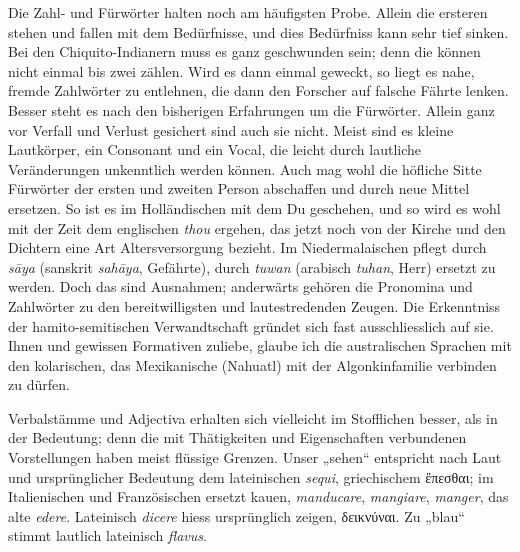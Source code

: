 Die Zahl- und Fürwörter halten noch am häufigsten Probe. Allein die ersteren stehen und fallen mit dem Bedürfnisse, und dies Bedürfniss kann sehr tief sinken. Bei den Chiquito-Indianern muss es ganz geschwunden sein; denn die können nicht einmal bis zwei zählen. Wird es dann einmal geweckt, so liegt es nahe, fremde Zahlwörter zu entlehnen, die dann den Forscher auf falsche Fährte lenken. Besser steht es nach den bisherigen Erfahrungen um die Fürwörter. Allein ganz vor Verfall und Verlust gesichert sind auch sie nicht. Meist sind es kleine Lautkörper, ein Consonant und ein Vocal, die leicht durch lautliche Veränderungen unkenntlich werden können. Auch mag wohl die höfliche Sitte Fürwörter der ersten und zweiten Person abschaffen und durch neue Mittel ersetzen. So ist es im Holländischen mit dem Du geschehen, und so wird es wohl mit der Zeit dem englischen \textit{thou} ergehen, das jetzt noch von der Kirche und den Dichtern eine Art Altersversorgung bezieht. Im Niedermalaischen pflegt  durch \textit{sāya} (sanskrit \textit{sahāya}, Gefährte),  durch \textit{tuwan} (arabisch \textit{tuhan}, Herr) ersetzt zu werden. Doch das sind Ausnahmen; anderwärts gehören die Pronomina und Zahlwörter zu den bereitwilligsten und lautestredenden Zeugen. Die Erkenntniss der hamito-semitischen Verwandtschaft gründet sich fast ausschliesslich auf sie. Ihnen und gewissen Formativen zuliebe, glaube ich die australischen Sprachen mit den kolarischen, das Mexikanische (Nahuatl) mit der Algonkinfamilie verbinden zu dürfen.

\begin{sloppypar}Verbalstämme und Adjectiva erhalten sich vielleicht im Stofflichen besser, als in der Bedeutung; denn die mit Thätigkeiten und Eigenschaften verbundenen Vorstellungen haben meist flüssige Grenzen. Unser „sehen“ entspricht nach Laut \label{sp.153} und ursprünglicher Bedeutung dem lateinischen \textit{sequi}, griechischem ἕπεσθαι; im Italienischen und Französischen ersetzt kauen, \textit{manducare}, \textit{mangiare}, \textit{manger}, das alte \textit{edere}. Lateinisch \textit{dicere} hiess ursprünglich zeigen, δεικνύναι. Zu  „blau“ stimmt lautlich lateinisch \textit{flavus}.\end{sloppypar}

